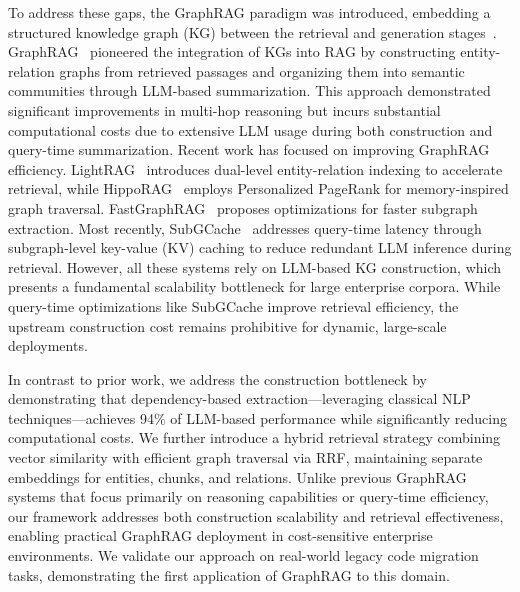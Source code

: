 \documentclass[runningheads]{llncs}
\begin{document}
To address these gaps, the GraphRAG paradigm was introduced, embedding a structured knowledge graph (KG) between the retrieval and generation stages~\cite{han2024retrieval}. GraphRAG~\cite{edge2024local} pioneered the integration of KGs into RAG by constructing entity-relation graphs from retrieved passages and organizing them into semantic communities through LLM-based summarization. This approach demonstrated significant improvements in multi-hop reasoning but incurs substantial computational costs due to extensive LLM usage during both construction and query-time summarization.
Recent work has focused on improving GraphRAG efficiency. LightRAG~\cite{guo2025lightragsimplefastretrievalaugmented} introduces dual-level entity-relation indexing to accelerate retrieval, while HippoRAG~\cite{jimenez2024hipporag} employs Personalized PageRank for memory-inspired graph traversal. FastGraphRAG~\cite{fastgraphrag2025} proposes optimizations for faster subgraph extraction. Most recently, SubGCache~\cite{zhu2025subgcache} addresses query-time latency through subgraph-level key-value (KV) caching to reduce redundant LLM inference during retrieval.
However, all these systems rely on LLM-based KG construction, which presents a fundamental scalability bottleneck for large enterprise corpora. While query-time optimizations like SubGCache improve retrieval efficiency, the upstream construction cost remains prohibitive for dynamic, large-scale deployments.

In contrast to prior work, we address the construction bottleneck by demonstrating that dependency-based extraction—leveraging classical NLP techniques—achieves 94\% of LLM-based performance while significantly reducing computational costs. We further introduce a hybrid retrieval strategy combining vector similarity with efficient graph traversal via RRF, maintaining separate embeddings for entities, chunks, and relations. Unlike previous GraphRAG systems that focus primarily on reasoning capabilities or query-time efficiency, our framework addresses both construction scalability and retrieval effectiveness, enabling practical GraphRAG deployment in cost-sensitive enterprise environments. We validate our approach on real-world legacy code migration tasks, demonstrating the first application of GraphRAG to this domain.
\end{document}

